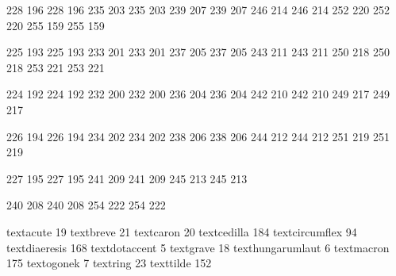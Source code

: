 

\startmapping[texnansi] 

 228 196  228 196  
 235 203  235 203
 239 207  239 207
 246 214  246 214
 252 220  252 220
 255 159  255 159

 225 193  225 193
 233 201  233 201
 237 205  237 205
 243 211  243 211
 250 218  250 218
 253 221  253 221

 224 192  224 192
 232 200  232 200
 236 204  236 204
 242 210  242 210
 249 217  249 217

 226 194  226 194
 234 202  234 202
 238 206  238 206
 244 212  244 212
 251 219  251 219

 227 195  227 195
 241 209  241 209
 245 213  245 213

 240 208  240 208  
 254 222  254 222  

\stopmapping

\startencoding[texnansi]

 textacute         19
 textbreve         21
 textcaron         20
 textcedilla      184  
 textcircumflex    94 %
 textdiaeresis    168
 textdotaccent      5
 textgrave         18
 texthungarumlaut   6
 textmacron       175 
 textogonek         7
 textring          23
 texttilde        152

